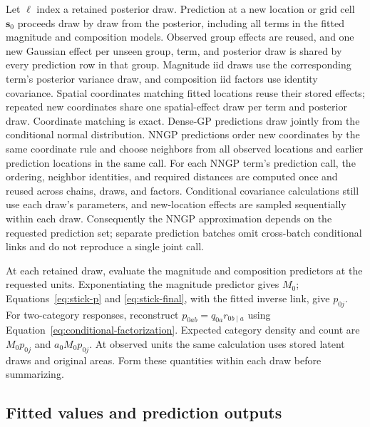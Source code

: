 \documentclass[11pt]{article}
\newcommand{\bs}{\bm{s}}
\begin{document}
Let \(\ell\) index a retained posterior draw. Prediction at a new location or grid cell \(\bs_0\) proceeds draw by draw from
the posterior, including all terms in the fitted magnitude and composition
models. Observed group effects
are reused, and one new Gaussian effect per unseen group, term, and posterior
draw is shared by every prediction row in that group. Magnitude iid draws use
the corresponding term's posterior variance draw, and composition iid factors
use identity covariance.
Spatial coordinates matching fitted locations reuse their stored effects;
repeated new coordinates share one spatial-effect draw per term and posterior
draw. Coordinate matching is exact.
Dense-GP predictions draw jointly from the conditional normal distribution.
NNGP predictions order new coordinates by the same coordinate rule and choose neighbors
from all observed locations and earlier prediction locations in the same call.
For each NNGP term's prediction call, the ordering, neighbor identities, and
required distances are computed once and reused across chains, draws, and
factors. Conditional covariance calculations still use each draw's parameters,
and new-location effects are sampled sequentially within each draw.
Consequently the NNGP approximation depends on the requested prediction set;
separate prediction batches omit cross-batch conditional links and do not
reproduce a single joint call.

At each retained draw, evaluate the magnitude and composition predictors at
the requested units. Exponentiating the magnitude predictor gives \(M_0\);
Equations~\ref{eq:stick-p} and \ref{eq:stick-final}, with the fitted inverse
link, give \(p_{0j}\). For two-category responses, reconstruct
\(p_{0ab}=q_{0a}r_{0b\mid a}\) using
Equation~\ref{eq:conditional-factorization}. Expected category density and
count are \(M_0p_{0j}\) and \(a_0M_0p_{0j}\). At observed units the same
calculation uses stored latent draws and original areas. Form these quantities
within each draw before summarizing.

\subsection{Fitted values and prediction outputs}
\label{sec:prediction-paths}
\end{document}
